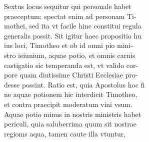 \documentclass{article}
\begin{document}
\begin{pages}
                Sextus locus sequitur qui personale habet \\
                praeceptum: spectat enim ad personam Ti- \\
                mothei, sed ita vt facile hinc constitui regula \\
                generalis possit. Sit igitur haec propositio hu \\
                ius loci, Timotheo et ob id omni pio mini- \\
                stro ieiunium, aquae potio, et omnis carnis \\
                castigatio sic temperanda est, vt valido cor- \\
                pore quam diutissime Christi Ecclesiae pro- \\
                desse possint. Ratio est, quia Apostolus hoc fi \\
                ne aquae potionem hic interdicit Timotheo, \\
                et contra praecipit moderatum vini vsum. \\
                Aquae potio minus in nostris ministris habet \\
                periculi, quia saluberrima quum sit nostrae \\
                regioms aqua, tamen caute illa vtuntur, \\
                

\end{pages}
\end{document}

